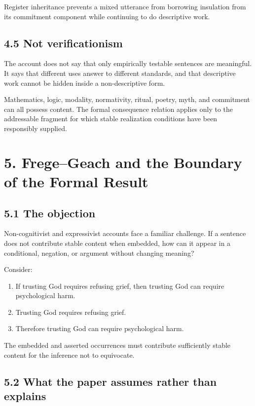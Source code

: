 \documentclass[
  11pt,
]{article}
\providecommand{\tightlist}{%
  \setlength{\itemsep}{0pt}\setlength{\parskip}{0pt}}
\begin{document}
Register inheritance prevents a mixed utterance from borrowing
insulation from its commitment component while continuing to do
descriptive work.

\subsection{4.5 Not verificationism}\label{not-verificationism}

The account does not say that only empirically testable sentences are
meaningful. It says that different uses answer to different standards,
and that descriptive work cannot be hidden inside a non-descriptive
form.

Mathematics, logic, modality, normativity, ritual, poetry, myth, and
commitment can all possess content. The formal consequence relation
applies only to the addressable fragment for which stable realization
conditions have been responsibly supplied.

\section{5. Frege--Geach and the Boundary of the Formal
Result}\label{fregegeach-and-the-boundary-of-the-formal-result}

\subsection{5.1 The objection}\label{the-objection}

Non-cognitivist and expressivist accounts face a familiar challenge. If
a sentence does not contribute stable content when embedded, how can it
appear in a conditional, negation, or argument without changing meaning?

Consider:

\begin{enumerate}
\def\labelenumi{\arabic{enumi}.}
\tightlist
\item
  If trusting God requires refusing grief, then trusting God can require
  psychological harm.
\item
  Trusting God requires refusing grief.
\item
  Therefore trusting God can require psychological harm.
\end{enumerate}

The embedded and asserted occurrences must contribute sufficiently
stable content for the inference not to equivocate.

\subsection{5.2 What the paper assumes rather than
explains}\label{what-the-paper-assumes-rather-than-explains}
\end{document}
